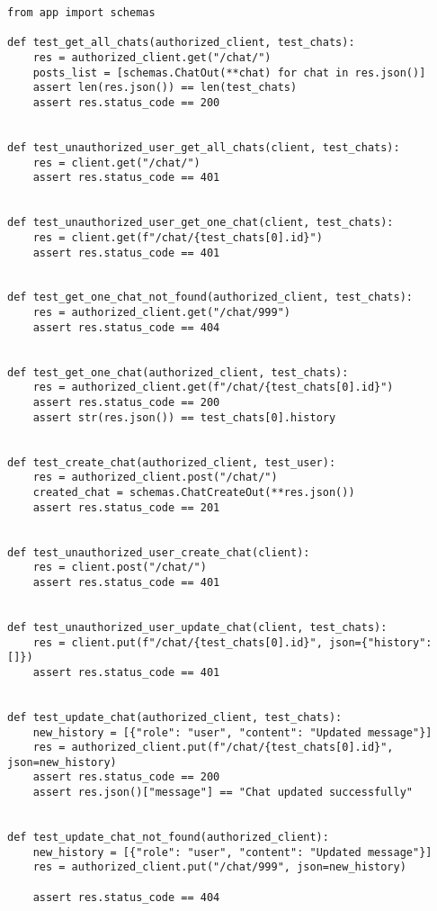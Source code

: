 \begin{Verbatim}[breaklines=true, breakanywhere=true]
from app import schemas

def test_get_all_chats(authorized_client, test_chats):
    res = authorized_client.get("/chat/")
    posts_list = [schemas.ChatOut(**chat) for chat in res.json()]
    assert len(res.json()) == len(test_chats)
    assert res.status_code == 200


def test_unauthorized_user_get_all_chats(client, test_chats):
    res = client.get("/chat/")
    assert res.status_code == 401


def test_unauthorized_user_get_one_chat(client, test_chats):
    res = client.get(f"/chat/{test_chats[0].id}")
    assert res.status_code == 401


def test_get_one_chat_not_found(authorized_client, test_chats):
    res = authorized_client.get("/chat/999")
    assert res.status_code == 404


def test_get_one_chat(authorized_client, test_chats):
    res = authorized_client.get(f"/chat/{test_chats[0].id}")
    assert res.status_code == 200
    assert str(res.json()) == test_chats[0].history


def test_create_chat(authorized_client, test_user):
    res = authorized_client.post("/chat/")
    created_chat = schemas.ChatCreateOut(**res.json())
    assert res.status_code == 201


def test_unauthorized_user_create_chat(client):
    res = client.post("/chat/")
    assert res.status_code == 401


def test_unauthorized_user_update_chat(client, test_chats):
    res = client.put(f"/chat/{test_chats[0].id}", json={"history": []})
    assert res.status_code == 401


def test_update_chat(authorized_client, test_chats):
    new_history = [{"role": "user", "content": "Updated message"}]
    res = authorized_client.put(f"/chat/{test_chats[0].id}", json=new_history)
    assert res.status_code == 200
    assert res.json()["message"] == "Chat updated successfully"


def test_update_chat_not_found(authorized_client):
    new_history = [{"role": "user", "content": "Updated message"}]
    res = authorized_client.put("/chat/999", json=new_history)

    assert res.status_code == 404
\end{Verbatim}


